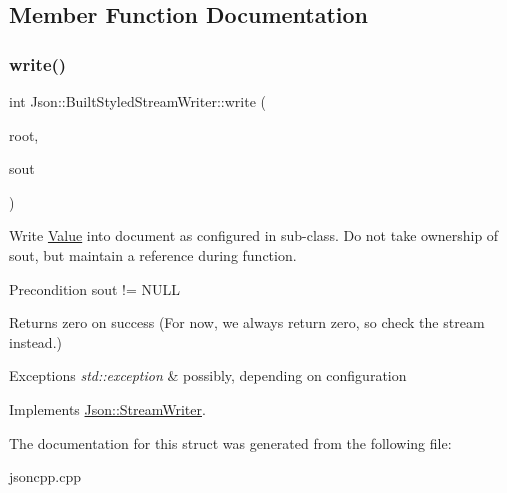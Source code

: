 \subsection{Member Function Documentation}
\mbox{\label{structJson_1_1BuiltStyledStreamWriter_a823cdb1afabb6b0d5f39bcd5a6a6f747}} 
\subsubsection{\texorpdfstring{write()}{write()}}
{\footnotesize\ttfamily int Json\+::\+Built\+Styled\+Stream\+Writer\+::write (\begin{DoxyParamCaption}\item[{\hyperlink{classJson_1_1Value}{Value} const \&}]{root,  }\item[{J\+S\+O\+N\+C\+P\+P\+\_\+\+O\+S\+T\+R\+E\+AM $\ast$}]{sout }\end{DoxyParamCaption})\hspace{0.3cm}{\ttfamily [virtual]}}

Write \hyperlink{classJson_1_1Value}{Value} into document as configured in sub-\/class. Do not take ownership of sout, but maintain a reference during function. \begin{DoxyPrecond}{Precondition}
sout != N\+U\+LL 
\end{DoxyPrecond}
\begin{DoxyReturn}{Returns}
zero on success (For now, we always return zero, so check the stream instead.) 
\end{DoxyReturn}

\begin{DoxyExceptions}{Exceptions}
{\em std\+::exception} & possibly, depending on configuration \\
\hline
\end{DoxyExceptions}


Implements \hyperlink{classJson_1_1StreamWriter_a84278bad0c9a9fc587bc2a97c5bb5993}{Json\+::\+Stream\+Writer}.



The documentation for this struct was generated from the following file\+:\begin{DoxyCompactItemize}
\item 
jsoncpp.\+cpp\end{DoxyCompactItemize}
